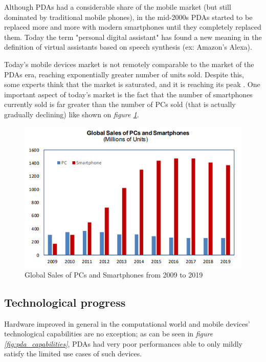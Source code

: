 Although PDAs had a considerable share of the mobile market (but still dominated by traditional mobile phones), in the mid-2000s PDAs started to be replaced more and more with modern smartphones until they completely replaced them.
Today the term "personal digital assistant" has found a new meaning in the definition of virtual assistants based on speech synthesis (ex: Amazon's Alexa).

Today's mobile devices market is not remotely comparable to the market of the PDAs era, reaching exponentially greater number of units sold. Despite this, some experts think that the market is saturated, and it is reaching its peak \cite{smartphones_sales}. One important aspect of today's market is the fact that the number of smartphones currently sold is far greater than the number of PCs sold (that is actually gradually declining) like shown on \textit{figure \ref{fig:global_sales_of_pcs_and_smartphones}}.

\begin{figure}[!ht]
    \centering
    \includegraphics[scale=0.9]{document/chapters/chapter_1/images/global_sales_of_pcs_and_smartphones.png}
    \caption{Global Sales of PCs and Smartphones from 2009 to 2019 \cite{smartphones_sales}}
    \label{fig:global_sales_of_pcs_and_smartphones}
\end{figure}

\subsection{Technological progress}
Hardware improved in general in the computational world and mobile devices' technological capabilities are no exception; as can be seen in \textit{figure \ref{fig:pda_capabilities}}, PDAs had very poor performances able to only mildly satisfy the limited use cases of such devices. 


